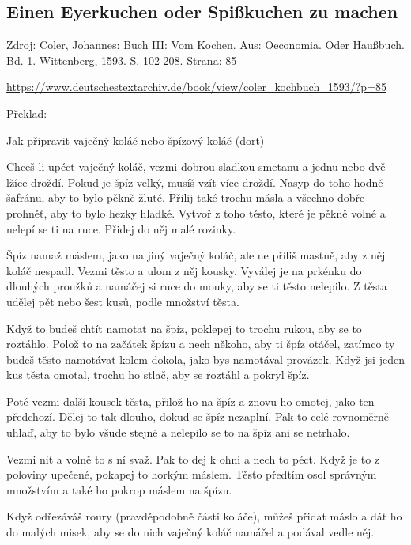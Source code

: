 \subsection{Einen Eyerkuchen oder Spißkuchen zu
machen}\label{250605-2334}

Zdroj: Coler, Johannes: Buch III: Vom Kochen. Aus: Oeconomia. Oder
Haußbuch. Bd. 1. Wittenberg, 1593. S. 102-208. Strana: 85

\url{https://www.deutschestextarchiv.de/book/view/coler_kochbuch_1593/?p=85}

Překlad:

Jak připravit vaječný koláč nebo špízový koláč (dort)

Chceš-li upéct vaječný koláč, vezmi dobrou sladkou smetanu a jednu nebo
dvě lžíce droždí. Pokud je špíz velký, musíš vzít více droždí. Nasyp do
toho hodně šafránu, aby to bylo pěkně žluté. Přilij také trochu másla a
všechno dobře prohněť, aby to bylo hezky hladké. Vytvoř z toho těsto,
které je pěkně volné a nelepí se ti na ruce. Přidej do něj malé rozinky.

Špíz namaž máslem, jako na jiný vaječný koláč, ale ne příliš mastně, aby
z něj koláč nespadl. Vezmi těsto a ulom z něj kousky. Vyválej je na
prkénku do dlouhých proužků a namáčej si ruce do mouky, aby se ti těsto
nelepilo. Z těsta udělej pět nebo šest kusů, podle množství těsta.

Když to budeš chtít namotat na špíz, poklepej to trochu rukou, aby se to
roztáhlo. Polož to na začátek špízu a nech někoho, aby ti špíz otáčel,
zatímco ty budeš těsto namotávat kolem dokola, jako bys namotával
provázek. Když jsi jeden kus těsta omotal, trochu ho stlač, aby se
roztáhl a pokryl špíz.

Poté vezmi další kousek těsta, přilož ho na špíz a znovu ho omotej, jako
ten předchozí. Dělej to tak dlouho, dokud se špíz nezaplní. Pak to celé
rovnoměrně uhlaď, aby to bylo všude stejné a nelepilo se to na špíz ani
se netrhalo.

Vezmi nit a volně to s ní svaž. Pak to dej k ohni a nech to péct. Když
je to z poloviny upečené, pokapej to horkým máslem. Těsto předtím osol
správným množstvím a také ho pokrop máslem na špízu.

Když odřezáváš roury (pravděpodobně části koláče), můžeš přidat máslo a
dát ho do malých misek, aby se do nich vaječný koláč namáčel a podával
vedle něj.
